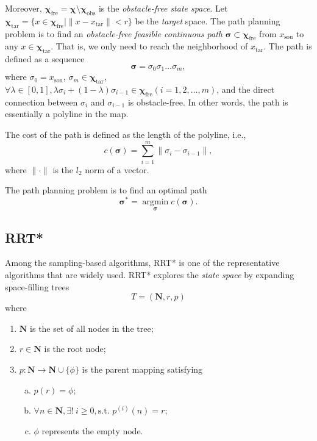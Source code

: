 \documentclass[smallcondensed]{svjour3}     %
\begin{document}
Moreover, $\bm{\chi}_{\textrm{fre}} = \bm{\chi} \setminus \bm{\chi}_{\textrm{obs}}$ is the \emph{obstacle-free state space}.
Let $\bm{\chi}_{\textrm{tar}} = \{x \in \bm{\chi}_{\textrm{fre}} \vert \lVert x - x_{\textrm{tar}} \rVert < r\}$ be the \emph{target} space.
The path planning problem is to find an \emph{obstacle-free feasible continuous path} $\bm{\sigma} \subset \bm{\chi}_{\textrm{fre}}$ from $x_{\textrm{sou}}$ to any $x \in \bm{\chi}_{\textrm{tar}}$.
That is, we only need to reach the neighborhood of $x_{\textrm{tar}}$.
The path is defined as a sequence
\begin{equation}\label{equation: path}
	\bm{\sigma} = \sigma_0 \sigma_1 \dots \sigma_m,
\end{equation}
where $\sigma_0 = x_{\textrm{sou}}$, $\sigma_m \in \bm{\chi}_{\textrm{tar}}$,
$\forall \lambda \in [0, 1], \lambda \sigma_i + (1 - \lambda)\sigma_{i - 1} \in \bm{\chi}_{\textrm{fre}} (i = 1, 2, \dots, m)$, and
	the direct connection between $\sigma_i$ and $\sigma_{i - 1}$ is obstacle-free.
In other words, the path is essentially a polyline in the map.

The cost of the path is defined as the length of the polyline, i.e.,
\begin{equation}\label{equation: path-cost}
	c(\bm{\sigma}) = \sum_{i=1}^{m} \lVert \sigma_i - \sigma_{i - 1} \rVert,
\end{equation}
where $\lVert \cdot \rVert$ is the $l_2$ norm of a vector.

The path planning problem is to find an optimal path
\begin{equation}\label{equation: optimal-path}
	\bm{\sigma}^* = \mathop{\arg\min} \limits_{\bm{\sigma}} c(\bm{\sigma}).
\end{equation}

\subsection{RRT*}\label{subsection: rrt-star}
Among the sampling-based algorithms, RRT* is one of the representative algorithms that are widely used.
RRT* explores the \emph{state space} by expanding space-filling trees
\begin{equation}\label{equation: space-filling trees}
	T = (\mathbf{N}, r, p)
\end{equation}
where
\begin{enumerate}[1)]
	\item $\mathbf{N}$ is the set of all nodes in the tree;
	\item $r \in \mathbf{N}$ is the root node;
	\item $p: \mathbf{N} \to \mathbf{N} \cup \{\phi\}$ is the parent mapping satisfying
	\begin{enumerate}[a)]
		\item $p(r) = \phi$;
		\item $\forall n \in \mathbf{N}, \exists ! \ i \geq 0, \textrm{s.t. } p^{(i)}(n) =r$;
		\item $\phi$ represents the empty node.
	\end{enumerate}
\end{enumerate}
\end{document}
